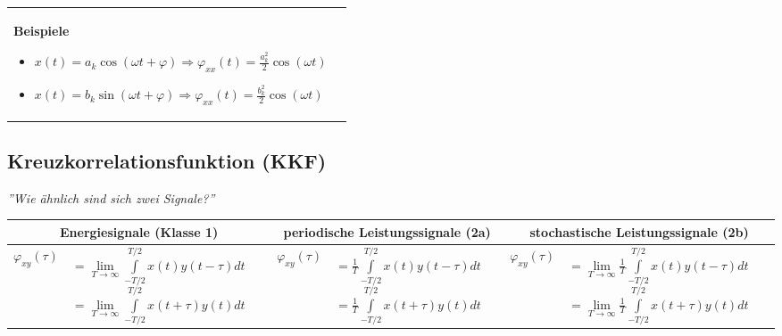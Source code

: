 \begin{tabularx}{\textwidth}{lX}
{   			\textbf{Beispiele}
   			\begin{itemize}
     			\item $x(t) = a_k \cos(\omega t + \varphi) \Rightarrow \varphi_{xx}(t) = \frac{a_k^2}{2} \cos(\omega t)$
     			\item $x(t) = b_k \sin(\omega t + \varphi) \Rightarrow \varphi_{xx}(t) = \frac{b_k^2}{2} \cos(\omega t)$
   			\end{itemize}
   		} \\
		\end{tabularx}
		

		
	\subsection{Kreuzkorrelationsfunktion (KKF) } 
		\textit{''Wie ähnlich sind sich zwei Signale?'' \ }
	
		\bgroup
		\setlength{\tabcolsep}{1mm}
		\begin{tabularx}{\textwidth}{|cX|cX|cX|}
		\hline 
			\multicolumn{2}{|c|}{\textbf{Energiesignale} (Klasse 1)} &
			\multicolumn{2}{|c|}{\textbf{periodische Leistungssignale} (2a)} & 
			\multicolumn{2}{|c|}{\textbf{stochastische Leistungssignale} (2b)}
		\\ \hline 
			$ \varphi_{xy}(\tau) $ &
			$ 		= \lim\limits_{T\to\infty}\int\limits_{-T/2}^{T/2} x(t)y(t-\tau)dt $ \linebreak
				$ 	= \lim\limits_{T\to\infty}\int\limits_{-T/2}^{T/2} x(t+\tau)y(t)dt $ &
			$ \varphi_{xy}(\tau) $ &
			$ 		= \frac {1} {T} \int\limits_{-T/2}^{T/2} x(t)y(t-\tau)dt $ \linebreak
				$	= \frac {1} {T} \int\limits_{-T/2}^{T/2} x(t+\tau)y(t)dt $ &
			$ \varphi_{xy}(\tau) $ &
			$		= \lim\limits_{T\rightarrow\infty} \frac {1} {T} \int\limits_{-T/2}^{T/2} x(t)y(t-\tau)dt $ \linebreak
				$	= \lim\limits_{T\rightarrow\infty}\frac {1} {T} \int\limits_{-T/2}^{T/2} x(t+\tau)y(t)dt $
		\\ \hline
		\end{tabularx} 
		\egroup

